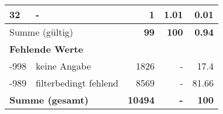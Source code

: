 \begin{longtable}{lXrrr}
     32 &
     \multicolumn{1}{X}{ -  } &


       \num{1} &
       \num[round-mode=places,round-precision=2]{1.01} &
         \num[round-mode=places,round-precision=2]{0.01} \\
     \midrule
     \multicolumn{2}{l}{Summe (gültig)} &
       \textbf{\num{99}} &
     \textbf{\num{100}} &
       \textbf{\num[round-mode=places,round-precision=2]{0.94}} \\
     \multicolumn{5}{l}{\textbf{Fehlende Werte}}\\
       -998 &
       keine Angabe &
         \num{1826} &
        - &
         \num[round-mode=places,round-precision=2]{17.4} \\
       -989 &
       filterbedingt fehlend &
         \num{8569} &
        - &
         \num[round-mode=places,round-precision=2]{81.66} \\
     \midrule
     \multicolumn{2}{l}{\textbf{Summe (gesamt)}} &
          \textbf{\num{10494}} &
        \textbf{-} &
        \textbf{\num{100}} \\
     \bottomrule
     \end{longtable}
     

